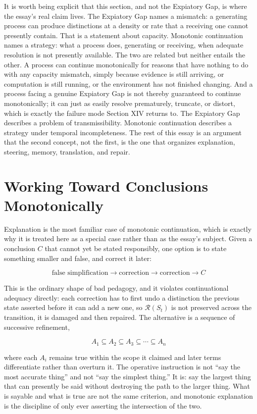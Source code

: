 \documentclass[11pt]{article}
\begin{document}
It is worth being explicit that this section, and not the Expiatory Gap, is where the essay's real claim lives. The Expiatory Gap names a mismatch: a generating process can produce distinctions at a density or rate that a receiving one cannot presently contain. That is a statement about capacity. Monotonic continuation names a strategy: what a process does, generating or receiving, when adequate resolution is not presently available. The two are related but neither entails the other. A process can continue monotonically for reasons that have nothing to do with any capacity mismatch, simply because evidence is still arriving, or computation is still running, or the environment has not finished changing. And a process facing a genuine Expiatory Gap is not thereby guaranteed to continue monotonically; it can just as easily resolve prematurely, truncate, or distort, which is exactly the failure mode Section XIV returns to. The Expiatory Gap describes a problem of transmissibility. Monotonic continuation describes a strategy under temporal incompleteness. The rest of this essay is an argument that the second concept, not the first, is the one that organizes explanation, steering, memory, translation, and repair.

\section{Working Toward Conclusions Monotonically}

Explanation is the most familiar case of monotonic continuation, which is exactly why it is treated here as a special case rather than as the essay's subject. Given a conclusion $C$ that cannot yet be stated responsibly, one option is to state something smaller and false, and correct it later:

\[
\text{false simplification} \rightarrow \text{correction} \rightarrow \text{correction} \rightarrow C
\]

This is the ordinary shape of bad pedagogy, and it violates continuational adequacy directly: each correction has to first undo a distinction the previous state asserted before it can add a new one, so $\mathcal{R}(S_t)$ is not preserved across the transition, it is damaged and then repaired. The alternative is a sequence of successive refinement,

\[
A_1 \subseteq A_2 \subseteq A_3 \subseteq \cdots \subseteq A_n
\]

where each $A_i$ remains true within the scope it claimed and later terms differentiate rather than overturn it. The operative instruction is not ``say the most accurate thing'' and not ``say the simplest thing.'' It is: say the largest thing that can presently be said without destroying the path to the larger thing. What is sayable and what is true are not the same criterion, and monotonic explanation is the discipline of only ever asserting the intersection of the two.
\end{document}
